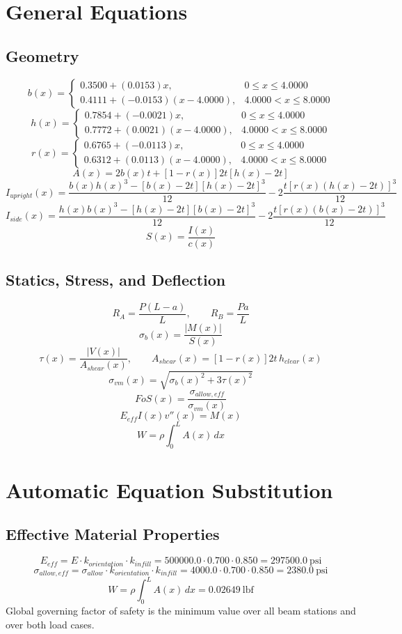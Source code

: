 \documentclass[11pt]{article}
\begin{document}
\section*{General Equations}
\subsection*{Geometry}
\[
b(x)=\begin{cases}0.3500 + (0.0153)x, & 0 \le x \le 4.0000\\0.4111 + (-0.0153)(x-4.0000), & 4.0000 < x \le 8.0000\end{cases}
\]
\[
h(x)=\begin{cases}0.7854 + (-0.0021)x, & 0 \le x \le 4.0000\\0.7772 + (0.0021)(x-4.0000), & 4.0000 < x \le 8.0000\end{cases}
\]
\[
r(x)=\begin{cases}0.6765 + (-0.0113)x, & 0 \le x \le 4.0000\\0.6312 + (0.0113)(x-4.0000), & 4.0000 < x \le 8.0000\end{cases}
\]
\[
A(x)=2b(x)t+[1-r(x)]2t[h(x)-2t]
\]
\[
I_{upright}(x)=\frac{b(x)h(x)^3-[b(x)-2t][h(x)-2t]^3}{12}-2\frac{t[r(x)(h(x)-2t)]^3}{12}
\]
\[
I_{side}(x)=\frac{h(x)b(x)^3-[h(x)-2t][b(x)-2t]^3}{12}-2\frac{t[r(x)(b(x)-2t)]^3}{12}
\]
\[
S(x)=\frac{I(x)}{c(x)}
\]

\subsection*{Statics, Stress, and Deflection}
\[
R_A=\frac{P(L-a)}{L}, \qquad R_B=\frac{Pa}{L}
\]
\[
\sigma_b(x)=\frac{|M(x)|}{S(x)}
\]
\[
\tau(x)=\frac{|V(x)|}{A_{shear}(x)}, \qquad A_{shear}(x)=[1-r(x)]2t\,h_{clear}(x)
\]
\[
\sigma_{vm}(x)=\sqrt{\sigma_b(x)^2+3\tau(x)^2}
\]
\[
FoS(x)=\frac{\sigma_{allow,eff}}{\sigma_{vm}(x)}
\]
\[
E_{eff}I(x)v''(x)=M(x)
\]
\[
W=\rho\int_0^L A(x)\,dx
\]

\section*{Automatic Equation Substitution}
\subsection*{Effective Material Properties}
\[E_{eff} = E \cdot k_{orientation} \cdot k_{infill} = 500000.0 \cdot 0.700 \cdot 0.850 = 297500.0\ \mathrm{psi}\]
\[\sigma_{allow,eff} = \sigma_{allow} \cdot k_{orientation} \cdot k_{infill} = 4000.0 \cdot 0.700 \cdot 0.850 = 2380.0\ \mathrm{psi}\]
\[W = \rho \int_0^L A(x)\,dx = 0.02649\ \mathrm{lbf}\]
Global governing factor of safety is the minimum value over all beam stations and over both load cases.
\end{document}

